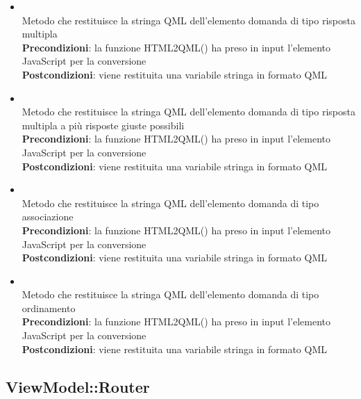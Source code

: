 \begin{itemize}
\begin{itemize}
		\item{}\\
		 Metodo che restituisce la stringa QML dell'elemento domanda di tipo risposta multipla\\
		\textbf{Precondizioni}: la funzione HTML2QML() ha preso in input l'elemento JavaScript per la conversione\\
		\textbf{Postcondizioni}: viene restituita una variabile stringa in formato QML \\
		
		\item{}\\
		 Metodo che restituisce la stringa QML dell'elemento domanda di tipo risposta multipla a più risposte giuste possibili\\
		\textbf{Precondizioni}: la funzione HTML2QML() ha preso in input l'elemento JavaScript per la conversione\\
		\textbf{Postcondizioni}: viene restituita una variabile stringa in formato QML \\
		
		\item{}\\
		 Metodo che restituisce la stringa QML dell'elemento domanda di tipo associazione\\
		\textbf{Precondizioni}: la funzione HTML2QML() ha preso in input l'elemento JavaScript per la conversione\\
		\textbf{Postcondizioni}: viene restituita una variabile stringa in formato QML \\
		
		\item{}\\
		 Metodo che restituisce la stringa QML dell'elemento domanda di tipo ordinamento\\
		\textbf{Precondizioni}: la funzione HTML2QML() ha preso in input l'elemento JavaScript per la conversione\\
		\textbf{Postcondizioni}: viene restituita una variabile stringa in formato QML \\
		
	\end{itemize}
\end{itemize}
\newpage

\subsection{ViewModel::Router}
